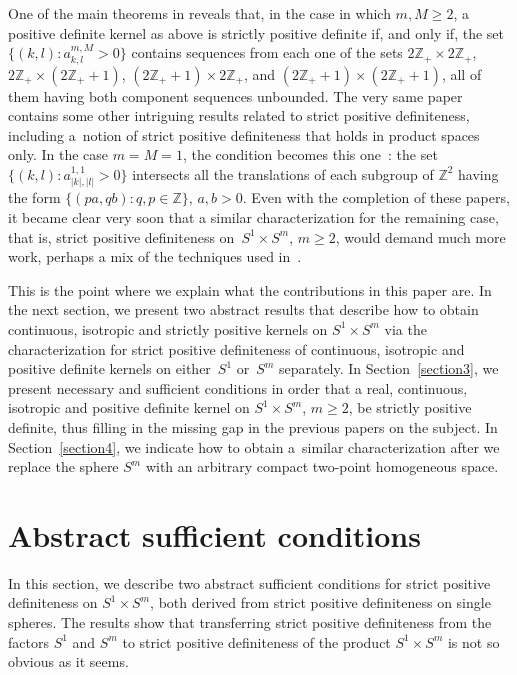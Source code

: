\documentclass[pdftex]{sigma}
\numberwithin{equation}{section}
\begin{document}
One of the main theorems in \cite{jean0} reveals that, in the case in which $m,M \geq 2$, a positive def\/inite kernel as above is strictly positive def\/inite if, and only if, the set $\{(k,l)\colon a_{k,l}^{m,M}>0\}$ contains sequences from each one of the sets $2\mathbb{Z}_+ \times 2\mathbb{Z}_+$, $2\mathbb{Z}_+ \times (2\mathbb{Z}_++1)$, $(2\mathbb{Z}_++1) \times 2\mathbb{Z}_+$, and $(2\mathbb{Z}_++1) \times (2\mathbb{Z}_++1)$, all of them having both component sequences unbounded. The very same paper contains some other intriguing results related to strict positive def\/initeness, including a~notion of strict positive def\/initeness that holds in product spaces only. In the case $m=M=1$, the condition becomes this one~\cite{jean1}: the set $\{(k,l)\colon a_{|k|,|l|}^{1,1}>0\}$ intersects all the translations of each subgroup of $\mathbb{Z}^2$ having the form $\{(pa, qb)\colon q,p\in \mathbb{Z}\}$, $a,b>0$. Even with the completion of these papers, it became clear very soon that a similar characterization for the remaining case, that is, strict positive def\/initeness on~$S^1 \times S^m$, $m\geq 2$, would demand much more work, perhaps a mix of the techniques used in~\cite{jean0,jean1}.

This is the point where we explain what the contributions in this paper are. In the next section, we present two abstract results that describe how to obtain continuous, isotropic and strictly positive kernels on $S^1 \times S^m$ via the characterization for strict positive def\/initeness of continuous, isotropic and positive def\/inite kernels on either~$S^1$ or~$S^m$ separately. In Section~\ref{section3}, we present necessary and suf\/f\/icient conditions in order that a real, continuous, isotropic and positive def\/inite kernel on $S^1 \times S^m$, $m\geq 2$, be strictly positive def\/inite, thus f\/illing in the missing gap in the previous papers on the subject. In Section~\ref{section4}, we indicate how to obtain a~similar characterization after we replace the sphere $S^m$ with an arbitrary compact two-point homogeneous space.

\section{Abstract suf\/f\/icient conditions}\label{section2}

In this section, we describe two abstract suf\/f\/icient conditions for strict positive def\/initeness on $S^1 \times S^m$, both derived from strict positive def\/initeness on single spheres. The results show that transferring strict positive def\/initeness from the factors $S^1$ and $S^m$ to strict positive def\/initeness of the product $S^1 \times S^m$ is not so obvious as it seems.
\end{document}
